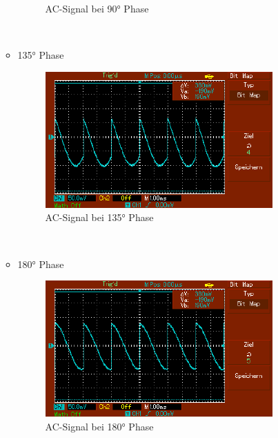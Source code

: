 \documentclass[captions=tableheading]{scrartcl}
\begin{document}
\begin{itemize}
\begin{itemize}
\begin{figure}
                \caption{AC-Signal bei 90° Phase}
                \label{fig:90sig2}
            \end{figure}
            \\
            \newpage
            \item{135° Phase}
            \begin{figure}
                \centering
                \includegraphics{Lock_In Bilder/Aufgabe 3/MAP004.pdf}
                \caption{AC-Signal bei 135° Phase}
                \label{fig:135sig2}
            \end{figure}
            \\
            \item{180° Phase}
            \begin{figure}
                \centering
                \includegraphics{Lock_In Bilder/Aufgabe 3/MAP005.pdf}
                \caption{AC-Signal bei 180° Phase}
                \label{fig:180sig2}
            \end{figure}
            \\
            \end{itemize}
        

\end{itemize}
\end{document}
